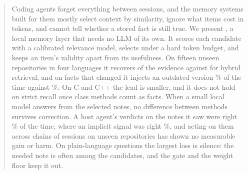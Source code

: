 \begin{abstract}
Coding agents forget everything between sessions, and the memory systems built for them mostly select context by similarity, ignore what items cost in tokens, and cannot tell whether a stored fact is still true. We present \kanerva, a local memory layer that needs no LLM of its own. It scores each candidate with a calibrated relevance model, selects under a hard token budget, and keeps an item's validity apart from its usefulness. On fifteen unseen repositories in four languages it recovers  of the evidence against  for hybrid retrieval, and on facts that changed it injects an outdated version \% of the time against \%. On C and C++ the lead is smaller, and it does not hold on strict recall once class methods count as facts. When a small local model answers from the selected notes, no difference between methods survives correction. A host agent's verdicts on the notes it saw were right \% of the time, where an implicit signal was right \%, and acting on them across chains of sessions on unseen repositories has shown no measurable gain or harm. On plain-language questions the largest loss is silence: the needed note is often among the candidates, and the gate and the weight floor keep it out.
\end{abstract}
